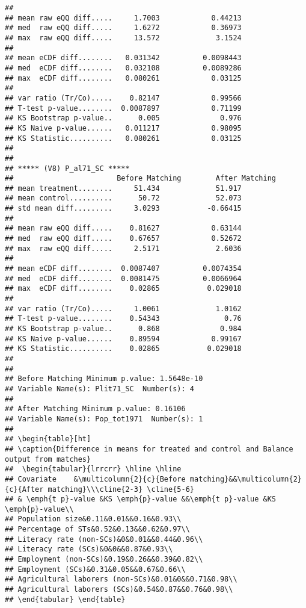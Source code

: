 \documentclass[
]{article}
\begin{document}
\begin{verbatim}
## 
## mean raw eQQ diff.....     1.7003            0.44213 
## med  raw eQQ diff.....     1.6272            0.36973 
## max  raw eQQ diff.....     13.572             3.1524 
## 
## mean eCDF diff........   0.031342          0.0098443 
## med  eCDF diff........   0.032108          0.0089286 
## max  eCDF diff........   0.080261            0.03125 
## 
## var ratio (Tr/Co).....    0.82147            0.99566 
## T-test p-value........  0.0087897            0.71199 
## KS Bootstrap p-value..      0.005              0.976 
## KS Naive p-value......   0.011217            0.98095 
## KS Statistic..........   0.080261            0.03125 
## 
## 
## ***** (V8) P_al71_SC *****
##                        Before Matching        After Matching
## mean treatment........     51.434             51.917 
## mean control..........      50.72             52.073 
## std mean diff.........     3.0293           -0.66415 
## 
## mean raw eQQ diff.....    0.81627            0.63144 
## med  raw eQQ diff.....    0.67657            0.52672 
## max  raw eQQ diff.....     2.5171             2.6036 
## 
## mean eCDF diff........  0.0087407          0.0074354 
## med  eCDF diff........  0.0081475          0.0066964 
## max  eCDF diff........    0.02865           0.029018 
## 
## var ratio (Tr/Co).....     1.0061             1.0162 
## T-test p-value........    0.54343               0.76 
## KS Bootstrap p-value..      0.868              0.984 
## KS Naive p-value......    0.89594            0.99167 
## KS Statistic..........    0.02865           0.029018 
## 
## 
## Before Matching Minimum p.value: 1.5648e-10 
## Variable Name(s): Plit71_SC  Number(s): 4 
## 
## After Matching Minimum p.value: 0.16106 
## Variable Name(s): Pop_tot1971  Number(s): 1 
## 
## \begin{table}[ht] 
## \caption{Difference in means for treated and control and Balance output from matches} 
##  \begin{tabular}{lrrcrr} \hline \hline 
## Covariate    &\multicolumn{2}{c}{Before matching}&&\multicolumn{2}{c}{After matching}\\\cline{2-3} \cline{5-6} 
## & \emph{t p}-value &KS \emph{p}-value &&\emph{t p}-value &KS \emph{p}-value\\
## Population size&0.11&0.01&&0.16&0.93\\
## Percentage of STs&0.52&0.13&&0.62&0.97\\
## Literacy rate (non-SCs)&0&0.01&&0.44&0.96\\
## Literacy rate (SCs)&0&0&&0.87&0.93\\
## Employment (non-SCs)&0.19&0.26&&0.39&0.82\\
## Employment (SCs)&0.31&0.05&&0.67&0.66\\
## Agricultural laborers (non-SCs)&0.01&0&&0.71&0.98\\
## Agricultural laborers (SCs)&0.54&0.87&&0.76&0.98\\
## \end{tabular} \end{table}
\end{verbatim}
\end{document}
